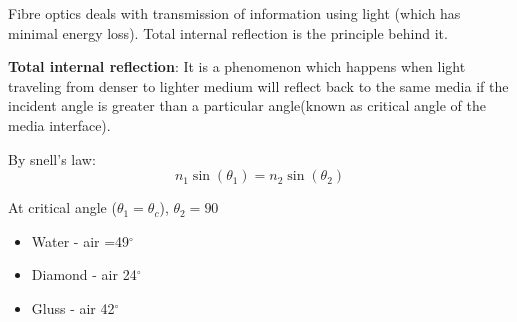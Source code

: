 \documentclass[12pt, a4paper]{article}
\begin{document}

Fibre optics deals with transmission of information using light (which has minimal energy loss). Total internal reflection is the principle behind it.

\textbf{Total internal reflection}: It is a phenomenon which happens when light traveling from denser to lighter medium will reflect back to the same media if the incident angle is greater than a particular angle(known as  critical angle of the media interface).

\begin{minipage}[t][][b]{.57\textwidth}%
	By snell's law:
	$$
		n_{1} \sin \left(\theta_{1}\right)=n_{2} \sin \left(\theta_{2}\right)
	$$

	At critical angle ($\theta_1 = \theta_c$), $\theta_{2}=90$
	\vspace{-.5cm}

	\begin{itemize}
		\item Water - air =49$^{\circ}$
		\item Diamond - air 24$^{\circ}$
		\item Gluss - air 42$^{\circ}$
	\end{itemize}
\end{minipage}%
\begin{minipage}[t][][b]{.4\textwidth}%

	

	

\end{minipage}
\end{document}
